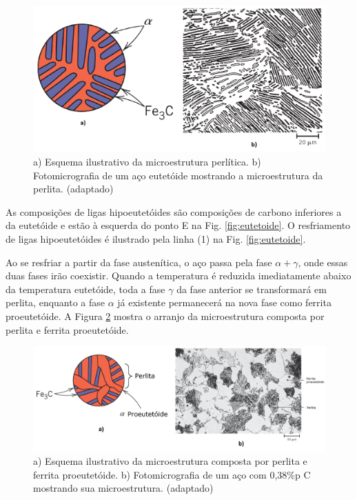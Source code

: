 \documentclass[
12pt,
openany, %
oneside, %
a4paper,			
english,			
brazil			        %
]{abntbibufjf}
\begin{document}
	\begin{figure}[H]
		\centering
		\includegraphics[width=1\textwidth]{perlita}
		\caption{a) Esquema ilustrativo da microestrutura perlítica. b) Fotomicrografia de um aço eutetóide mostrando a microestrutura da perlita. \cite{callister2011materials} (adaptado)}
		\label{fig:perlita}
	\end{figure}

	As composições de ligas hipoeutetóides são composições de carbono inferiores a da eutetóide e estão à esquerda do ponto E na Fig. \ref{fig:eutetoide}. O resfriamento de ligas hipoeutetóides é ilustrado pela linha (1) na Fig. \ref{fig:eutetoide}.
	
	Ao se resfriar a partir da fase austenítica, o aço passa pela fase $\alpha+\gamma$, onde essas duas fases irão coexistir. Quando a temperatura é reduzida imediatamente abaixo da temperatura eutetóide, toda a fase $\gamma$ da fase anterior se transformará em perlita, enquanto a fase $\alpha$ já existente permanecerá na nova fase como ferrita proeutetóide. A Figura \ref{fig:perlita_hipo} mostra o arranjo da microestrutura composta por perlita e ferrita proeutetóide.
	
	\begin{figure}[H]
		\centering
		\includegraphics[width=1\textwidth]{perlita_hipo}
		\caption{a) Esquema ilustrativo da microestrutura composta por perlita e ferrita proeutetóide. b) Fotomicrografia de um aço com 0,38\%p C mostrando sua microestrutura. \cite{callister2011materials} (adaptado)}
		\label{fig:perlita_hipo}
	\end{figure}
\end{document}
